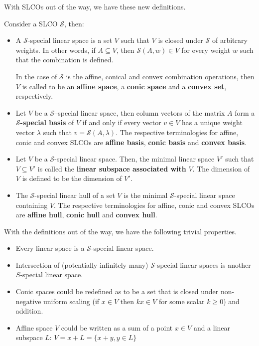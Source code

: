 With SLCOs out of the way, we have these new definitions.

\begin{definition}
  Consider a SLCO \( \mathcal{S} \), then:
  \begin{itemize}
    \item A \( \mathcal{S} \)-special linear space is a set \( V \) such that \( V \) is
      closed under \( \mathcal{S} \) of arbitrary weights. In other words, if \(
      A \subseteq V \), then \( \mathcal{S}(A, w) \in V \) for every weight \( w
      \) such that the combination is defined.

      In the case of \( \mathcal{S} \) is the affine, conical and convex
      combination operations, then \( V \) is called to be an \textbf{affine
      space}, a \textbf{conic space} and a \textbf{convex set}, respectively.

    \item Let \( V \) be a \( \mathcal{S} \)--special linear space, then column
      vectors of the matrix \( A \) form a \( \mathcal{S} \)\textbf{-special
      basis} of \( V \) if
      and only if every vector \( v \in V \) has a unique weight vector \(
      \lambda \) such that \( v = \mathcal{S}(A, \lambda) \). The respective
      terminologies for affine, conic and convex SLCOs are \textbf{affine
      basis}, \textbf{conic basis} and \textbf{convex basis}.

    \item Let \( V \) be a \( \mathcal{S} \)-special linear space. Then, the
      minimal linear space \( V' \) such that \( V \subseteq V' \) is called the
      \textbf{linear subspace associated with} \( V \). The dimension of \( V \)
      is defined to be the dimension of \( V' \).

    \item The \( \mathcal{S} \)-special linear hull of a set \( V \) is the
      minimal \( \mathcal{S} \)-special linear space containing \( V \). The
      respective terminologies for affine, conic and convex SLCOs are
      \textbf{affine hull}, \textbf{conic hull} and \textbf{convex hull}.
\end{itemize}
\end{definition}

With the definitions out of the way, we have the following trivial properties.

\begin{itemize}
  \item Every linear space is a \( \mathcal{S} \)-special linear space.
  \item Intersection of (potentially infinitely many) \( \mathcal{S} \)-special
    linear spaces is another \( S \)-special linear space.
  \item Conic spaces could be redefined as to be a set that is  closed under
    non-negative uniform scaling (if \( x \in
    V\) then \( kx \in V \) for some scalar \( k \ge 0 \)) and addition.
  \item Affine space \( V \) could be written as a sum of a point \( x \in V \)
    and a linear subspace \( L \): \( V = x + L = \{x + y, y \in L\}   \)
\end{itemize}

